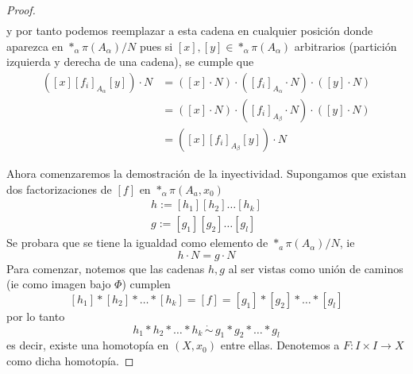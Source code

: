 \begin{proof}
\begin{align*}
  \end{align*}
  y por tanto podemos reemplazar a esta cadena en cualquier posición
  donde aparezca en \(*_\alpha \pi (A_\alpha) / N\) pues si \([x] , [y] \in
  *_\alpha \pi(A_\alpha)\) arbitrarios (partición izquierda y derecha de
  una cadena), se cumple que
  \begin{align*}
    \left( [x] [f_i]_{A_\alpha} [y] \right) \cdot N
    &= \left( [x] \cdot N \right) \cdot \left([f_i]_{A_\alpha} \cdot N
       \right) \cdot \left( [y] \cdot N \right) \\
    &= \left( [x] \cdot N \right) \cdot \left(
      [f_i]_{A_\beta} \cdot N \right) \cdot \left( [y]
      \cdot N \right) \\
    &= \left( [x] [f_i]_{A_\beta} [y] \right) \cdot N
  \end{align*}

  Ahora comenzaremos la demostración de la inyectividad. Supongamos
  que existan dos factorizaciones de \([f]\) en
  \(*_\alpha \pi (A_a, x_0)\)
  \begin{gather*}
    h := [h_1][h_2]\dotsc [h_k] \\
    g := [g _1][g _2]\dotsc [g _l]
  \end{gather*}
  Se probara que se tiene la igualdad como elemento de \(*_a \pi
  (A_\alpha) / N\), ie
  \[ h \cdot N = g\cdot N\]
  Para comenzar, notemos que las cadenas \(h,g\) al ser vistas como
  unión de caminos (ie como imagen bajo \(\Phi\)) cumplen
  \[ [h_1] * [h_2] * \dotsc * [h_k] = [f] = [g _1] * [g _2] * \dotsc * [g _l] \]
  por lo tanto
  \[ h_1 * h_2 * \dotsc * h_k \, \dot \sim \, g _1 * g _2 * \dotsc *
    g _l \]
  es decir, existe una homotopía en \((X,x_0)\) entre ellas. Denotemos
  a \(F : I \times I \to X\) como dicha homotopía.


\end{proof}
